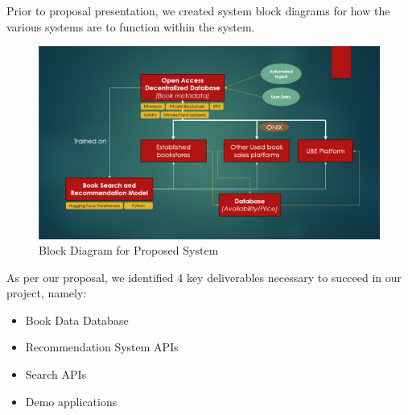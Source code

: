Prior to proposal presentation, we created system block diagrams for how the various systems are to function within the system.

\begin{figure}[htbp]
    \centering
    \includegraphics[width=1\textwidth]{../../assets/proposal_block_diagram.png}
    \caption{Block Diagram for Proposed System}
    \label{fig:example}
\end{figure}

As per our proposal, we identified 4 key deliverables necessary to succeed in our project, namely:

\begin{itemize}
    \item Book Data Database
    \item Recommendation System APIs
    \item Search APIs
    \item Demo applications
\end{itemize}